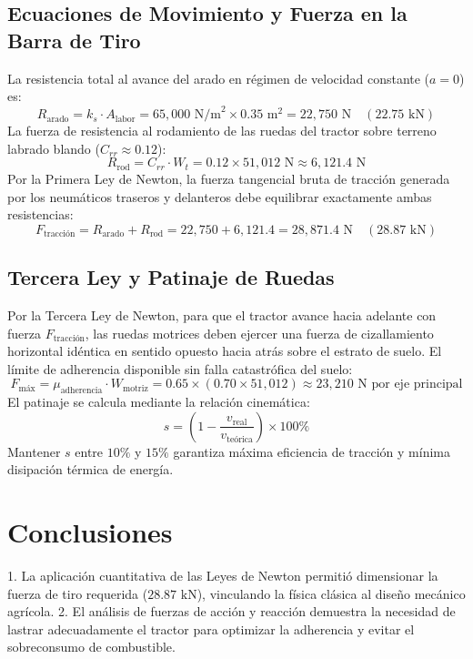 \documentclass[12pt,spanish,letterpaper,oneside]{article}
\begin{document}
\subsection{Ecuaciones de Movimiento y Fuerza en la Barra de Tiro}
La resistencia total al avance del arado en régimen de velocidad constante ($a=0$) es:
\begin{equation}
    R_{\text{arado}} = k_s \cdot A_{\text{labor}} = 65,000\text{ N/m}^2 \times 0.35\text{ m}^2 = 22,750\text{ N} \quad (22.75\text{ kN})
\end{equation}
La fuerza de resistencia al rodamiento de las ruedas del tractor sobre terreno labrado blando ($C_{rr} \approx 0.12$):
\begin{equation}
    R_{\text{rod}} = C_{rr} \cdot W_t = 0.12 \times 51,012\text{ N} \approx 6,121.4\text{ N}
\end{equation}
Por la Primera Ley de Newton, la fuerza tangencial bruta de tracción generada por los neumáticos traseros y delanteros debe equilibrar exactamente ambas resistencias:
\begin{equation}
    F_{\text{tracción}} = R_{\text{arado}} + R_{\text{rod}} = 22,750 + 6,121.4 = 28,871.4\text{ N} \quad (28.87\text{ kN})
\end{equation}

\subsection{Tercera Ley y Patinaje de Ruedas}
Por la Tercera Ley de Newton, para que el tractor avance hacia adelante con fuerza $F_{\text{tracción}}$, las ruedas motrices deben ejercer una fuerza de cizallamiento horizontal idéntica en sentido opuesto hacia atrás sobre el estrato de suelo.
El límite de adherencia disponible sin falla catastrófica del suelo:
\begin{equation}
    F_{\text{máx}} = \mu_{\text{adherencia}} \cdot W_{\text{motriz}} = 0.65 \times (0.70 \times 51,012) \approx 23,210\text{ N por eje principal}
\end{equation}
El patinaje se calcula mediante la relación cinemática:
\begin{equation}
    s = \left( 1 - \frac{v_{\text{real}}}{v_{\text{teórica}}} \right) \times 100\%
\end{equation}
Mantener $s$ entre $10\%$ y $15\%$ garantiza máxima eficiencia de tracción y mínima disipación térmica de energía.

\section{Conclusiones}
1. La aplicación cuantitativa de las Leyes de Newton permitió dimensionar la fuerza de tiro requerida ($28.87\text{ kN}$), vinculando la física clásica al diseño mecánico agrícola.
2. El análisis de fuerzas de acción y reacción demuestra la necesidad de lastrar adecuadamente el tractor para optimizar la adherencia y evitar el sobreconsumo de combustible.

\newpage
\printbibliography[title={Referencias bibliográficas}]
\end{document}
